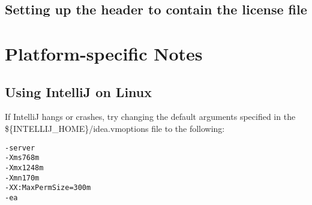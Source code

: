 \documentclass[11pt,fullpage]{article}
\begin{document}
\subsection{Setting up the header to contain the license file}

\section{Platform-specific Notes}

\subsection{Using IntelliJ on Linux}
If IntelliJ hangs or crashes, try changing the default arguments specified in the \$\{INTELLIJ\_HOME\}/idea.vmoptions file to the following:

\begin{verbatim}
-server
-Xms768m
-Xmx1248m
-Xmn170m
-XX:MaxPermSize=300m
-ea
\end{verbatim}
\end{document}
